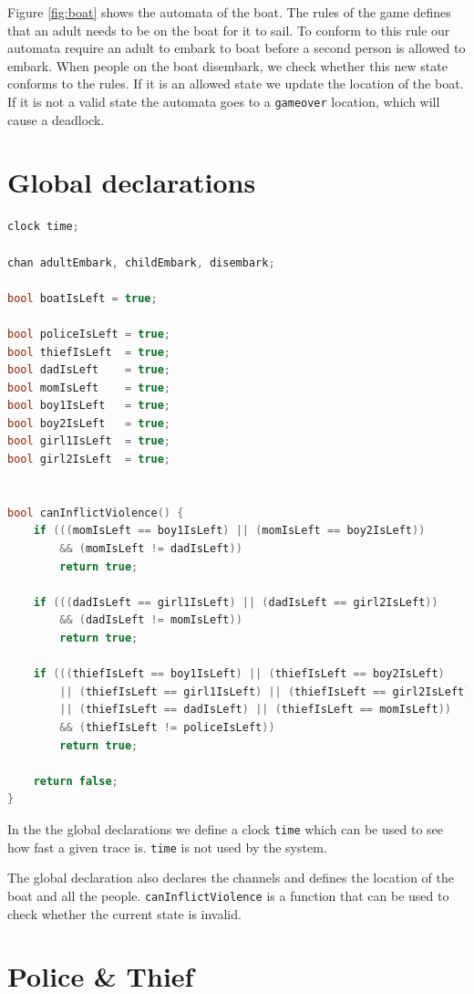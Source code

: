\documentclass[a4paper,12pt]{scrartcl}
\newcommand{\code}[1]{\colorbox{listinggray}{\texttt{#1}}}
\begin{document}
Figure \ref{fig:boat} shows the automata of the boat. The rules of the game defines that an adult needs to be on the boat for it to sail. To conform to this rule our automata require an adult to embark to boat before a second person is allowed to embark. When people on the boat disembark, we check whether this new state conforms to the rules. If it is an allowed state we update the location of the boat. If it is not a valid state the automata goes to a \code{gameover} location, which will cause a deadlock.


\section*{Global declarations}

\begin{lstlisting}[language=CPP, label = lst:plugin_example, caption = Global declaration.]
clock time;

chan adultEmbark, childEmbark, disembark;

bool boatIsLeft = true;

bool policeIsLeft = true;
bool thiefIsLeft  = true;
bool dadIsLeft    = true;
bool momIsLeft    = true;
bool boy1IsLeft   = true;
bool boy2IsLeft   = true;
bool girl1IsLeft  = true;
bool girl2IsLeft  = true;


bool canInflictViolence() {
    if (((momIsLeft == boy1IsLeft) || (momIsLeft == boy2IsLeft))
    	&& (momIsLeft != dadIsLeft))
        return true;

    if (((dadIsLeft == girl1IsLeft) || (dadIsLeft == girl2IsLeft))
    	&& (dadIsLeft != momIsLeft))
        return true;

    if (((thiefIsLeft == boy1IsLeft) || (thiefIsLeft == boy2IsLeft)
    	|| (thiefIsLeft == girl1IsLeft) || (thiefIsLeft == girl2IsLeft)
    	|| (thiefIsLeft == dadIsLeft) || (thiefIsLeft == momIsLeft))
    	&& (thiefIsLeft != policeIsLeft))
        return true;

    return false;
}
\end{lstlisting}

In the the global declarations we define a clock \code{time} which can be used to see how fast a given trace is. \code{time} is not used by the system.

The global declaration also declares the channels and defines the location of the boat and all the people. \code{canInflictViolence} is a function that can be used to check whether the current state is invalid. 

\section*{Police \& Thief}
\end{document}
